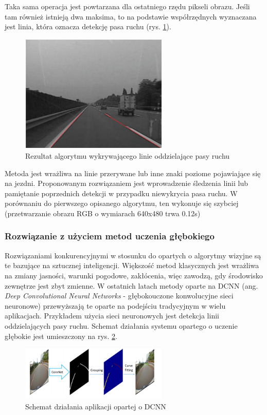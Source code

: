 Taka sama operacja jest powtarzana dla ostatniego rzędu pikseli obrazu. 
Jeśli tam również istnieją dwa maksima, to na podstawie współrzędnych wyznaczana jest linia, która oznacza detekcję pasa ruchu (rys. \ref{fig:lane_detection2_result}).

\begin{figure}
  \centering
  \includegraphics[width=7cm]{img/lane_detection2_result.png}
  \caption{Rezultat algorytmu wykrywającego linie oddzielające pasy ruchu\cite{T6}}
  \label{fig:lane_detection2_result}
\end{figure}

Metoda jest wrażliwa na linie przerywane lub inne znaki poziome pojawiające się na jezdni. Proponowanym rozwiązaniem jest wprowadzenie śledzenia linii lub pamiętanie poprzednich detekcji w przypadku niewykrycia pasa ruchu.
W porównaniu do pierwszego opisanego algorytmu, ten wykonuje się szybciej (przetwarzanie obrazu RGB o wymiarach 640x480 trwa 0.12s)

\subsubsection{Rozwiązanie z użyciem metod uczenia głębokiego}

Rozwiązaniami konkurencyjnymi w stosunku do opartych o algorytmy wizyjne są te bazujące na sztucznej inteligencji. 
Większość metod klasycznych jest wrażliwa na zmiany jasności, warunki pogodowe, zakłócenia, więc zawodzą, gdy środowisko zewnętrze jest zbyt zmienne. 
W ostatnich latach metody oparte na DCNN (ang. \textit{Deep Convolutional Neural Networks} - głębokouczone konwolucyjne sieci neuronowe) przewyższają te oparte na podejściu tradycyjnym w wielu aplikacjach. 
Przykładem użycia sieci neuronowych jest detekcja linii oddzielających pasy ruchu. 
Schemat działania systemu opartego o uczenie głębokie jest umieszczony na rys. \ref{fig:lane_detection3_cnn_general}.
\begin{figure}
  \centering
  \includegraphics[width=7cm]{img/lane_detection3_cnn_general.png}
  \caption{Schemat działania aplikacji opartej o DCNN\cite{T6}}
  \label{fig:lane_detection3_cnn_general}
\end{figure}

